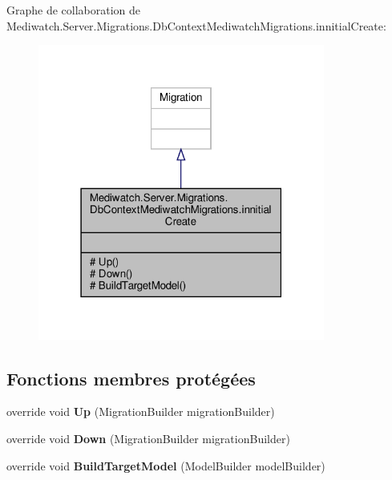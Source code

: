 Graphe de collaboration de Mediwatch.\+Server.\+Migrations.\+Db\+Context\+Mediwatch\+Migrations.\+innitial\+Create\+:
\nopagebreak
\begin{figure}[H]
\begin{center}
\leavevmode
\includegraphics[width=267pt]{class_mediwatch_1_1_server_1_1_migrations_1_1_db_context_mediwatch_migrations_1_1innitial_create__coll__graph}
\end{center}
\end{figure}
\subsection*{Fonctions membres protégées}
\begin{DoxyCompactItemize}
\item 
\mbox{\label{class_mediwatch_1_1_server_1_1_migrations_1_1_db_context_mediwatch_migrations_1_1innitial_create_aef1f061d376a2cd1f4d24f3b3b4f06a0}} 
override void {\bfseries Up} (Migration\+Builder migration\+Builder)
\item 
\mbox{\label{class_mediwatch_1_1_server_1_1_migrations_1_1_db_context_mediwatch_migrations_1_1innitial_create_adf827587ad324f346db044e7e9409e0a}} 
override void {\bfseries Down} (Migration\+Builder migration\+Builder)
\item 
\mbox{\label{class_mediwatch_1_1_server_1_1_migrations_1_1_db_context_mediwatch_migrations_1_1innitial_create_a69982625d14eda9615db6ba5340dda49}} 
override void {\bfseries Build\+Target\+Model} (Model\+Builder model\+Builder)
\end{DoxyCompactItemize}



